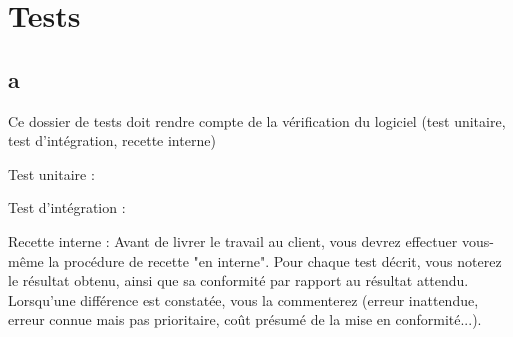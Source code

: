 	
	\part{Tests}
	
	\setcounter{chapter}{0} %
	\setcounter{section}{0} %
	
	\renewcommand*{\theHchapter}{\thepart.\thechapter}
	\chapter{a}
	
	Ce dossier de tests doit rendre compte de la vérification du logiciel (test unitaire, test d'intégration, recette interne)

Test unitaire :

Test d'intégration : 

Recette interne : Avant de livrer le travail au client, vous devrez effectuer vous-même la procédure de recette "en interne". Pour chaque test décrit, vous noterez le résultat obtenu, ainsi que sa conformité par rapport au résultat attendu. Lorsqu'une différence est constatée, vous la commenterez (erreur inattendue, erreur connue mais pas prioritaire, coût présumé de la mise en conformité...).